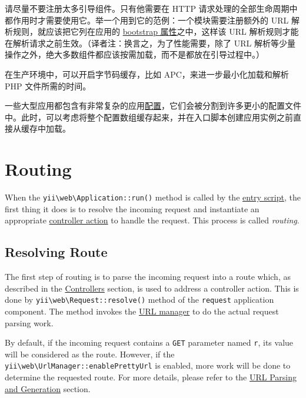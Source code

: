 请尽量不要注册太多引导组件。只有他需要在 HTTP 请求处理的全部生命周期中都作用时才需要使用它。举一个用到它的范例：一个模块需要注册额外的 URL 解析规则，就应该把它列在应用的
\hyperref[structure-applications.md::bootstrap]{bootstrap 属性}之中，这样该 URL 解析规则才能在解析请求之前生效。（译者注：换言之，为了性能需要，除了 URL 
解析等少量操作之外，绝大多数组件都应该按需加载，而不是都放在引导过程中。）

在生产环境中，可以开启字节码缓存，比如 APC，来进一步最小化加载和解析 PHP 文件所需的时间。

一些大型应用都包含有非常复杂的应用\hyperref[concept-configurations.md]{配置}，它们会被分割到许多更小的配置文件中。此时，可以考虑将整个配置数组缓存起来，并在入口脚本创建应用实例之前直接从缓存中加载。



\label{runtime-routing.md}\section{Routing}
When the \texttt{yii{\allowbreak{}\textbackslash}web{\allowbreak{}\textbackslash}Application\allowbreak{}::\allowbreak{}run()} method is called by the \hyperref[structure-entry-scripts.md]{entry script},
the first thing it does is to resolve the incoming request and instantiate an appropriate
\hyperref[structure-controllers.md]{controller action} to handle the request. This process is called \textit{routing}.

\subsection{Resolving Route \label{runtime-routing.md::resolving-route}}
The first step of routing is to parse the incoming request into a route which, as described in
the \hyperref[structure-controllers.md::routes]{Controllers} section, is used to address a controller action.
This is done by \texttt{yii{\allowbreak{}\textbackslash}web{\allowbreak{}\textbackslash}Request\allowbreak{}::\allowbreak{}resolve()} method of the \lstinline|request| application component.
The method invokes the \hyperref[runtime-url-handling.md]{URL manager} to do the actual request parsing work.

By default, if the incoming request contains a \lstinline|GET| parameter named \lstinline|r|, its value will be considered
as the route. However, if the \texttt{yii{\allowbreak{}\textbackslash}web{\allowbreak{}\textbackslash}UrlManager\allowbreak{}::\allowbreak{}enablePrettyUrl} is enabled,
more work will be done to determine the requested route. For more details, please refer to
the \hyperref[runtime-url-handling.md]{URL Parsing and Generation} section.

